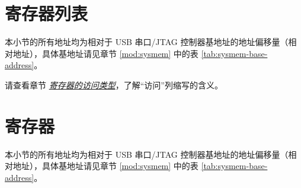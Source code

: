 \documentclass[main\_\_CN.tex]{subfiles}
\begin{document}



\clearpage
\hypertarget{usbserialjtag-reg-summ}{}
\section{寄存器列表}
\label{sec:usbserialjtag-reg-summ}

本小节的所有地址均为相对于 USB 串口/JTAG 控制器基地址的地址偏移量（相对地址），具体基地址请见章节 \ref{mod:sysmem} \textit{} 中的表 \ref{tab:sysmem-base-address}。

请查看章节 \hyperref[glossary-access-types]{\textit{寄存器的访问类型}}，了解“访问”列缩写的含义。






\clearpage
\section{寄存器}

本小节的所有地址均为相对于 USB 串口/JTAG 控制器基地址的地址偏移量（相对地址），具体基地址请见章节 \ref{mod:sysmem} \textit{} 中的表 \ref{tab:sysmem-base-address}。


\end{document}
